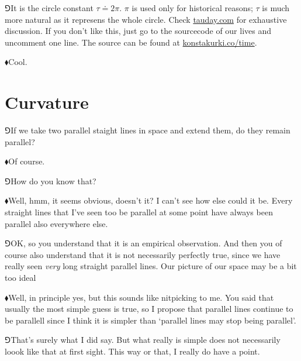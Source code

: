 \documentclass[10pt,oneside%
]{memoir}
\newcommand{\circc}{\tau}
\newcommand{\hea}{\(\blacklozenge\)\;}
\newcommand{\heb}{\(\Game\)\;}
\begin{document}
\heb It is the circle constant \(\circc\doteq2\pi\). \(\pi\) is used only for historical reasons; \(\circc\) is much more natural as it represens the whole circle. Check \url{tauday.com} for exhaustive discussion. If you don't like this, just go to the sourcecode of our lives and uncomment one line. The source can be found at \url{konstakurki.co/time}.

\hea Cool.






































\chapter{Curvature}
\heb If we take two parallel staight lines in space and extend them, do they remain parallel?

\hea Of course.

\heb How do you know that?

\hea Well, hmm, it seems obvious, doesn't it? I can't see how else could it be. Every straight lines that I've seen too be parallel at some point have always been parallel also everywhere else.

\heb OK, so you understand that it is an empirical observation. And then you of course also understand that it is not necessarily perfectly true, since we have really seen \emph{very} long straight parallel lines. Our picture of our space may be a bit too ideal

\hea Well, in principle yes, but this sounds like nitpicking to me. You said that usually the most simple guess is true, so I propose that parallel lines continue to be parallell since I think it is simpler than `parallel lines may stop being parallel'.

\heb That's surely what I did say. But what really is simple does not necessarily loook like that at first sight. This way or that, I really do have a point.
\end{document}

